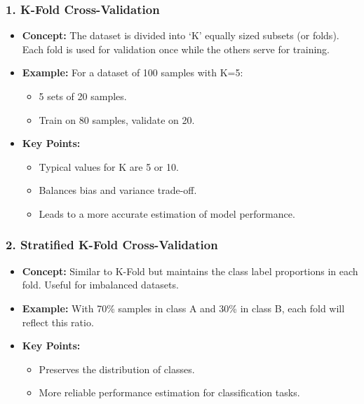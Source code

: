 \documentclass{beamer}
\begin{document}
\begin{frame}[fragile]
    \frametitle{1. K-Fold Cross-Validation}
    \begin{itemize}
        \item \textbf{Concept:} The dataset is divided into ‘K’ equally sized subsets (or folds). Each fold is used for validation once while the others serve for training.
        \item \textbf{Example:} For a dataset of 100 samples with K=5:
            \begin{itemize}
                \item 5 sets of 20 samples.
                \item Train on 80 samples, validate on 20.
            \end{itemize}
        \item \textbf{Key Points:}
            \begin{itemize}
                \item Typical values for K are 5 or 10.
                \item Balances bias and variance trade-off.
                \item Leads to a more accurate estimation of model performance.
            \end{itemize}
    \end{itemize}
\end{frame}

\begin{frame}[fragile]
    \frametitle{2. Stratified K-Fold Cross-Validation}
    \begin{itemize}
        \item \textbf{Concept:} Similar to K-Fold but maintains the class label proportions in each fold. Useful for imbalanced datasets.
        \item \textbf{Example:} With 70\% samples in class A and 30\% in class B, each fold will reflect this ratio.
        \item \textbf{Key Points:}
            \begin{itemize}
                \item Preserves the distribution of classes.
                \item More reliable performance estimation for classification tasks.
            \end{itemize}
    \end{itemize}
\end{frame}
\end{document}
